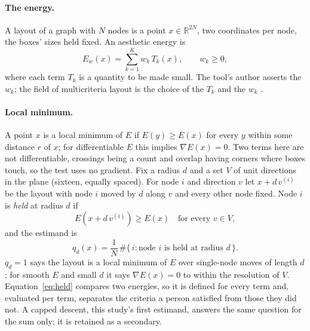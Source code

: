 \documentclass[11pt]{article}
\begin{document}
\paragraph{The energy.} A layout of a graph with $N$ nodes is a point
$x \in \mathbb{R}^{2N}$, two coordinates per node, the boxes' sizes held fixed. An aesthetic
energy is
\begin{equation}
E_w(x) = \sum_{k=1}^{K} w_k\, T_k(x), \qquad w_k \ge 0,
\end{equation}
where each term $T_k$ is a quantity to be made small. The tool's author asserts the
$w_k$; the field of multicriteria layout is the choice of the $T_k$ and the $w_k$
\cite{dh96, purchase02}.

\paragraph{Local minimum.} A point $x$ is a local minimum of $E$ if $E(y) \ge E(x)$ for every $y$
within some distance $r$ of $x$; for differentiable $E$ this implies $\nabla E(x) = 0$. Two
terms here are not differentiable, crossings being a count and overlap having corners where
boxes touch, so the test uses no gradient. Fix a radius $d$ and a set $V$ of unit directions in the plane (sixteen,
equally spaced). For node $i$ and direction $v$ let $x + d\,v^{(i)}$ be the layout with
node $i$ moved by $d$ along $v$ and every other node fixed. Node $i$ is \emph{held} at radius $d$ if
\begin{equation}
E(x + d\,v^{(i)}) \ge E(x) \quad \text{for every } v \in V,
\label{eq:held}
\end{equation}
and the estimand is
\begin{equation}
q_d(x) = \frac{1}{N}\,\#\{\,i : \text{node } i \text{ is held at radius } d\,\}.
\label{eq:q}
\end{equation}
$q_d = 1$ says the layout is a local minimum of $E$ over single-node moves of length $d$;
for smooth $E$ and small $d$ it says $\nabla E(x) = 0$ to within the resolution of $V$.
Equation~\eqref{eq:held} compares two energies, so it is defined for every term and,
evaluated per term, separates the criteria a person satisfied from those they did not. A capped
descent, this study's first estimand, answers the same question for the sum only; it is
retained as a secondary.
\end{document}
